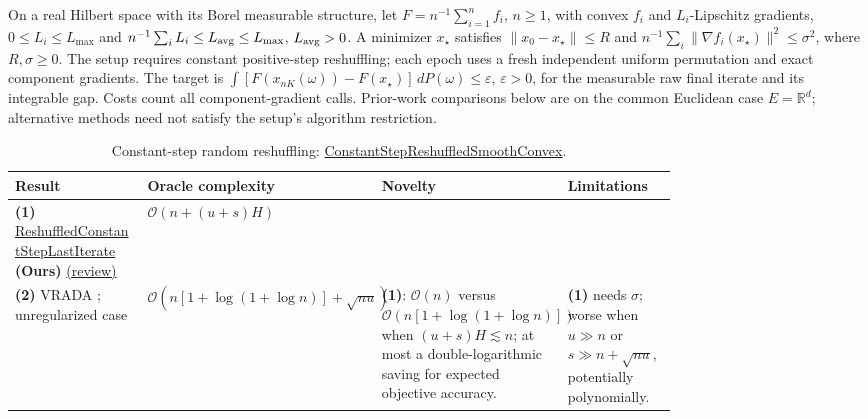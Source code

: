 \begin{table}[tp]
\centering
\caption{Constant-step random reshuffling: \href{https://github.com/k3nfalt/longtails/blob/main/LongTails/Setups/ConstantStepReshuffledSmoothConvex.lean}{ConstantStepReshuffledSmoothConvex}.}\label{tab:ConstantStepReshuffledSmoothConvex}
\parbox{\linewidth}{\footnotesize On a real Hilbert space with its Borel measurable structure, let $F=n^{-1}\sum_{i=1}^n f_i$, $n\ge1$, with convex $f_i$ and $L_i$-Lipschitz gradients, $0\le L_i\le L_{\max}$ and $n^{-1}\sum_iL_i\le L_{\rm avg}\le L_{\max}$, $L_{\rm avg}>0$. A minimizer $x_\star$ satisfies $\|x_0-x_\star\|\le R$ and $n^{-1}\sum_i\|\nabla f_i(x_\star)\|^2\le\sigma^2$, where $R,\sigma\ge0$. The setup requires constant positive-step reshuffling; each epoch uses a fresh independent uniform permutation and exact component gradients. The target is $\int [F(x_{nK}(\omega))-F(x_\star)]\,dP(\omega)\le\varepsilon$, $\varepsilon>0$, for the measurable raw final iterate and its integrable gap. Costs count all component-gradient calls. Prior-work comparisons below are on the common Euclidean case $E=\mathbb{R}^d$; alternative methods need not satisfy the setup's algorithm restriction.}\par\smallskip
\begin{threeparttable}
\footnotesize
\setlength{\tabcolsep}{4pt}\renewcommand{\arraystretch}{1.25}
\begin{tabularx}{\linewidth}{@{}>{\raggedright\arraybackslash}p{0.20\linewidth}>{\raggedright\arraybackslash}p{0.32\linewidth}>{\raggedright\arraybackslash}p{0.25\linewidth}>{\raggedright\arraybackslash}X@{}}
\toprule
\textbf{Result} & \textbf{Oracle complexity} & \textbf{Novelty} & \textbf{Limitations} \\
\midrule
\textbf{(1)} \href{https://github.com/k3nfalt/longtails/blob/main/LongTails/Theorems/ReshuffledConstantStepLastIterate.lean}{Reshuffled\allowbreak Constant\allowbreak Step\allowbreak Last\allowbreak Iterate} \textbf{(Ours)} \href{https://github.com/k3nfalt/longtails/blob/main/scripts/reviews/ReshuffledConstantStepLastIterate.md}{(review)}
& $\mathcal{O}\!\left(n+(u+s)H\right)$ & & \\
\midrule[1.2pt]
\textbf{(2)} VRADA \citep[Theorem~1]{csrrSong2021v4}; unregularized case
& $\mathcal{O}\!\left(n[1+\log(1+\log n)]+\sqrt{nu}\right)$
& \textbf{(1)}: $\mathcal{O}(n)$ versus $\mathcal{O}(n[1+\log(1+\log n)])$ when $(u+s)H\lesssim n$; at most a double-logarithmic saving for expected objective accuracy.
& \textbf{(1)} needs $\sigma$; worse when $u\gg n$ or $s\gg n+\sqrt{nu}$, potentially polynomially. \\

\end{tabularx}
\end{threeparttable}
\end{table}
